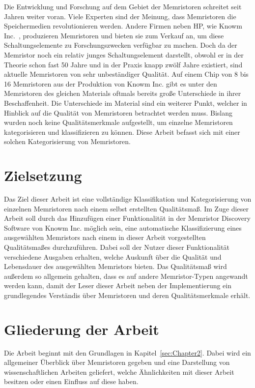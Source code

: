 Die Entwicklung und Forschung auf dem Gebiet der Memristoren schreitet seit Jahren weiter voran. Viele Experten sind der Meinung, dass Memristoren die Speichermedien revolutionieren werden. Andere Firmen neben HP, wie Knowm Inc.~\cite{knowm_comp_2019}, produzieren Memristoren und bieten sie zum Verkauf an, um diese Schaltungselemente zu Forschungszwecken verfügbar zu machen. Doch da der Memristor noch ein relativ junges Schaltungselement darstellt, obwohl er in der Theorie schon fast 50 Jahre und in der Praxis knapp zwölf Jahre existiert, sind aktuelle Memristoren von sehr unbeständiger Qualität. Auf einem Chip von 8 bis 16 Memristoren aus der Produktion von Knowm Inc. gibt es unter den Memristoren des gleichen Materials oftmals bereits große Unterschiede in ihrer Beschaffenheit. Die Unterschiede im Material sind ein weiterer Punkt, welcher in Hinblick auf die Qualität von Memristoren betrachtet werden muss. Bislang wurden noch keine
Qualitätsmerkmale aufgestellt, um einzelne Memristoren kategorisieren und klassifizieren zu können. Diese Arbeit befasst sich mit einer solchen Kategorisierung von Memristoren.

\section{Zielsetzung}

Das Ziel dieser Arbeit ist eine vollständige Klassifikation und Kategorisierung von einzelnen Memristoren nach einem selbst erstellten Qualitätsmaß. Im Zuge dieser Arbeit soll durch das Hinzufügen einer Funktionalität in der Memristor Discovery Software von Knowm Inc. möglich sein, eine automatische Klassifizierung eines ausgewählten Memristors nach einem in dieser Arbeit vorgestellten Qualitätsmaßes durchzuführen. Dabei soll der Nutzer dieser Funktionalität verschiedene Ausgaben erhalten, welche Auskunft über die Qualität und Lebensdauer des ausgewählten Memristors bieten. Das Qualitätsmaß wird außerdem so allgemein gehalten, dass es auf andere Memristor-Typen angewandt werden kann, damit der Leser dieser Arbeit neben der Implementierung ein grundlegendes Verständis über Memristoren und deren Qualitätsmerkmale erhält.

\section*{Gliederung der Arbeit}
\label{sec:Sec1.2}
Die Arbeit beginnt mit den Grundlagen in Kapitel~\ref{sec:Chapter2}. Dabei wird ein allgemeiner Überblick über Memristoren gegeben und eine Darstellung von wissenschaftlichen Arbeiten geliefert, welche Ähnlichkeiten mit dieser Arbeit besitzen oder einen Einfluss auf diese haben.

